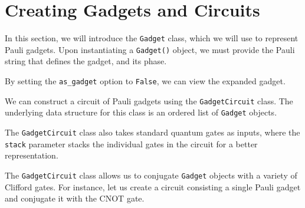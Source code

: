 \section{Creating Gadgets and Circuits}

In this section, we will introduce the \lstinline{Gadget} class, which we will use to represent Pauli gadgets. Upon instantiating a \lstinline{Gadget()} object, we must provide the Pauli string that defines the gadget, and its phase.


By setting the \lstinline{as_gadget} option to \lstinline{False}, we can view the expanded gadget.


We can construct a circuit of Pauli gadgets using the \lstinline{GadgetCircuit} class. The underlying data structure for this class is an ordered list of \lstinline{Gadget} objects.


The \lstinline{GadgetCircuit} class also takes standard quantum gates as inputs, where the \lstinline{stack} parameter stacks the individual gates in the circuit for a better representation.



The \lstinline{GadgetCircuit} class allows us to conjugate \lstinline{Gadget} objects with a variety of Clifford gates. For instance, let us create a circuit consisting a single Pauli gadget and conjugate it with the CNOT gate.
